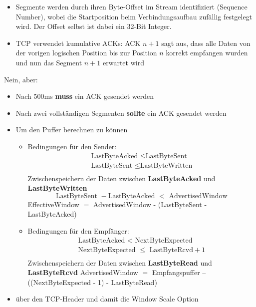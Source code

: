 
\begin{itemize}
    \item Segmente werden durch ihren Byte-Offset im Stream identifiziert (Sequence Number), wobei die Startposition beim Verbindungsaufbau zufällig festgelegt wird.
    Der Offset selbst ist dabei ein 32-Bit Integer.
    \item TCP verwendet kumulative ACKs: ACK $n+1$ sagt aus, dass alle Daten von der vorigen logischen Position bis zur Position $n$ korrekt empfangen wurden und nun das Segment $n+1$ erwartet wird
\end{itemize}

Nein, aber:
\begin{itemize}
    \item Nach 500ms \textbf{muss} ein ACK gesendet werden
    \item Nach zwei vollständigen Segmenten \textbf{sollte} ein ACK gesendet werden
\end{itemize}

\begin{itemize}
    \item Um den Puffer berechnen zu können
    \begin{itemize}
        \item Bedingungen für den Sender:
        \begin{gather*}
            \text{LastByteAcked }\leq \text{LastByteSent}\\
            \text{LastByteSent }\leq \text{LastByteWritten}\\
        \end{gather*}
        Zwischenspeichern der Daten zwischen \textbf{LastByteAcked} und \textbf{LastByteWritten}
        \[\text{LastByteSent }- \text{LastByteAcked }< \text{ AdvertisedWindow}\]
        EffectiveWindow $=$ AdvertisedWindow - (LastByteSent - LastByteAcked)
        \item Bedingungen für den Empfänger:
        \begin{gather*}
            \text{LastByteAcked }<\text{ NextByteExpected}\\
            \text{NextByteExpected }\leq \text{ LastByteRcvd} + 1\\
        \end{gather*}
        Zwischenspeichern der Daten zwischen \textbf{LastByteRead} und \textbf{LastByteRcvd}
        AdvertisedWindow $=$ Empfangspuffer – ((NextByteExpected - 1) - LastByteRead)
    \end{itemize}
    \item über den TCP-Header und damit die Window Scale Option
\end{itemize}

